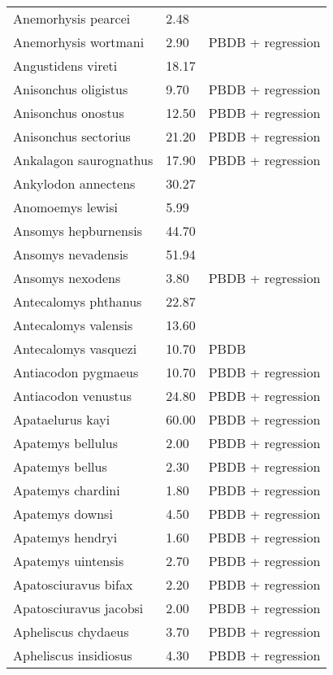 \documentclass{article}
\begin{document}
\begin{center}
\begin{longtable}{p{} p{} p{}}
    Anemorhysis pearcei & 2.48 & \cite{Albright2000} \\ 
    Anemorhysis wortmani & 2.90 & PBDB + regression \\ 
    Angustidens vireti & 18.17 & \cite{Tomiya2013} \\ 
    Anisonchus oligistus & 9.70 & PBDB + regression \\ 
    Anisonchus onostus & 12.50 & PBDB + regression \\ 
    Anisonchus sectorius & 21.20 & PBDB + regression \\ 
    Ankalagon saurognathus & 17.90 & PBDB + regression \\ 
    Ankylodon annectens & 30.27 & \cite{Tomiya2013} \\ 
    Anomoemys lewisi & 5.99 & \cite{Simons1960} \\ 
    Ansomys hepburnensis & 44.70 & \cite{Tomiya2013} \\ 
    Ansomys nevadensis & 51.94 & \cite{Tomiya2013} \\ 
    Ansomys nexodens & 3.80 & PBDB + regression \\ 
    Antecalomys phthanus & 22.87 & \cite{Tomiya2013} \\ 
    Antecalomys valensis & 13.60 & \cite{Tomiya2013} \\ 
    Antecalomys vasquezi & 10.70 & PBDB \\ 
    Antiacodon pygmaeus & 10.70 & PBDB + regression \\ 
    Antiacodon venustus & 24.80 & PBDB + regression \\ 
    Apataelurus kayi & 60.00 & PBDB + regression \\ 
    Apatemys bellulus & 2.00 & PBDB + regression \\ 
    Apatemys bellus & 2.30 & PBDB + regression \\ 
    Apatemys chardini & 1.80 & PBDB + regression \\ 
    Apatemys downsi & 4.50 & PBDB + regression \\ 
    Apatemys hendryi & 1.60 & PBDB + regression \\ 
    Apatemys uintensis & 2.70 & PBDB + regression \\ 
    Apatosciuravus bifax & 2.20 & PBDB + regression \\ 
    Apatosciuravus jacobsi & 2.00 & PBDB + regression \\ 
    Apheliscus chydaeus & 3.70 & PBDB + regression \\ 
    Apheliscus insidiosus & 4.30 & PBDB + regression \\ 

\end{longtable}
\end{center}
\end{document}
